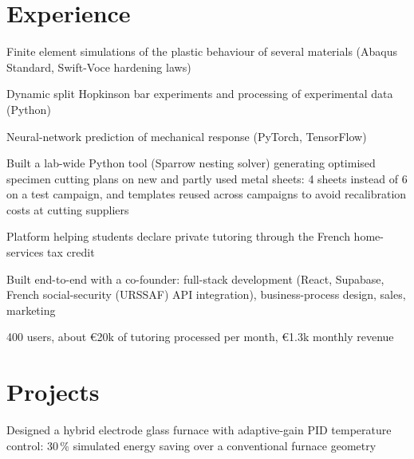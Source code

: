 
\section{Experience}

\begin{points}
  \item Finite element simulations of the plastic behaviour of several materials (Abaqus Standard, Swift-Voce hardening laws)
  \item Dynamic split Hopkinson bar experiments and processing of experimental data (Python)
  \item Neural-network prediction of mechanical response (PyTorch, TensorFlow)
  \item Built a lab-wide Python tool (Sparrow nesting solver) generating optimised specimen cutting plans on new and partly used metal sheets: 4 sheets instead of 6 on a test campaign, and templates reused across campaigns to avoid recalibration costs at cutting suppliers
\end{points}

\begin{points}
  \item Platform helping students declare private tutoring through the French home-services tax credit
  \item Built end-to-end with a co-founder: full-stack development (React, Supabase, French social-security (URSSAF) API integration), business-process design, sales, marketing
  \item 400 users, about €20k of tutoring processed per month, €1.3k monthly revenue
\end{points}

\section{Projects}

\begin{points}
  \item Designed a hybrid electrode glass furnace with adaptive-gain PID temperature control: 30\,\% simulated energy saving over a conventional furnace geometry
\end{points}

